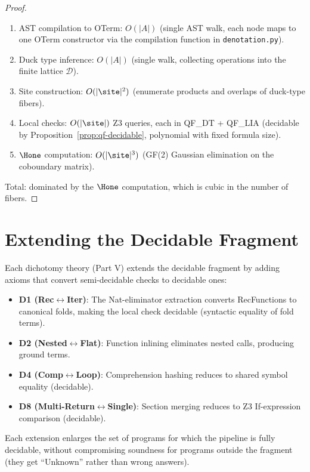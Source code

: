\begin{proof}
\begin{enumerate}
  \item AST compilation to OTerm: $O(|A|)$ (single AST walk,
    each node maps to one OTerm constructor via the compilation
    function in \texttt{denotation.py}).
  \item Duck type inference: $O(|A|)$ (single walk, collecting
    operations into the finite lattice $\mathcal{D}$).
  \item Site construction: $O(|\site|^2)$ (enumerate products and
    overlaps of duck-type fibers).
  \item Local checks: $O(|\site|)$ Z3 queries, each in QF\_DT +
    QF\_LIA (decidable by Proposition~\ref{prop:qf-decidable},
    polynomial with fixed formula size).
  \item $\Hone$ computation: $O(|\site|^3)$ (GF(2) Gaussian
    elimination on the coboundary matrix).
\end{enumerate}
Total: dominated by the $\Hone$ computation, which is cubic in the
number of fibers.
\end{proof}

\section{Extending the Decidable Fragment}

Each dichotomy theory (Part V) extends the decidable fragment by
adding axioms that convert semi-decidable checks to decidable ones:

\begin{itemize}
  \item \textbf{D1 (Rec$\leftrightarrow$Iter)}: The Nat-eliminator
    extraction converts RecFunctions to canonical folds, making the
    local check decidable (syntactic equality of fold terms).
  \item \textbf{D2 (Nested$\leftrightarrow$Flat)}: Function inlining
    eliminates nested calls, producing ground terms.
  \item \textbf{D4 (Comp$\leftrightarrow$Loop)}: Comprehension hashing
    reduces to shared symbol equality (decidable).
  \item \textbf{D8 (Multi-Return$\leftrightarrow$Single)}: Section
    merging reduces to Z3 If-expression comparison (decidable).
\end{itemize}

Each extension enlarges the set of programs for which the pipeline
is fully decidable, without compromising soundness for programs
outside the fragment (they get ``Unknown'' rather than wrong answers).

